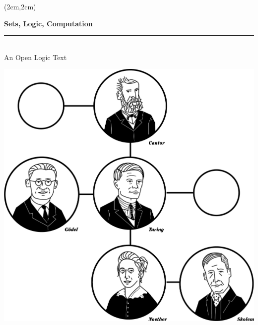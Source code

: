 \documentclass[11pt,openany]{memoir}
\begin{document}

\AtBeginShipoutNext{\AtBeginShipoutNext{\AtBeginShipoutDiscard}}

\begin{titlingpage}
  \pagecolor{leadbeater}
\begin{textblock*}{14cm}(2cm,2cm)%
  \begin{raggedright}
  \fontsize{32pt}{34pt}\selectfont\bfseries\sffamily%
  Sets, Logic, Computation\\
  \normalfont\fontsize{18pt}{0pt}\selectfont\bfseries\itshape%
    \rule{14cm}{5pt}\\[5pt]
  An Open Logic Text
\end{raggedright}

\vskip2cm\hskip-1cm\includegraphics[scale=.85]{illustrations/Cover}
  
\end{textblock*}
\
\end{titlingpage}

\nopagecolor



\end{document}
